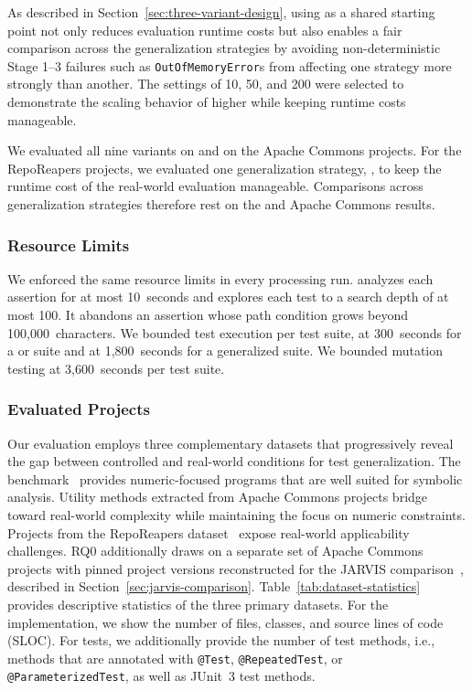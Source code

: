 As described in Section~\ref{sec:three-variant-design},
using \VariantInitial{} as a shared starting point
not only reduces evaluation runtime costs
but also enables a fair comparison
across the generalization strategies
by avoiding non-deterministic Stage 1--3 failures such as \texttt{OutOfMemoryError}s
from affecting one strategy more strongly than another.
The \tries{} settings of 10, 50, and 200 were selected
to demonstrate the scaling behavior of higher \tries{}
while keeping runtime costs manageable.

We evaluated all nine variants on \DatasetEqBench{} and on the Apache Commons projects.
For the RepoReapers projects, we evaluated one generalization strategy, \VariantImprovedC{},
to keep the runtime cost of the real-world evaluation manageable.
Comparisons across generalization strategies therefore
rest on the \DatasetEqBench{} and Apache Commons results.

\subsubsection{Resource Limits}

We enforced the same resource limits in every processing run.
\ToolSPF{} analyzes each assertion for at most 10~seconds
and explores each test to a search depth of at most 100.
It abandons an assertion whose path condition grows beyond 100,000~characters.
We bounded test execution per test suite,
at 300~seconds for a \VariantOriginal{} or \VariantInitial{} suite
and at 1,800~seconds for a generalized suite.
We bounded \ToolPit{} mutation testing at 3,600~seconds per test suite.

\subsubsection{Evaluated Projects}

Our evaluation employs three complementary datasets that progressively
reveal the gap between controlled and real-world conditions for test generalization.
The \DatasetEqBench{} benchmark~\cite{badihi_2021_eqbench}
provides numeric-focused programs
that are well suited for symbolic analysis.
Utility methods extracted from Apache Commons projects
bridge toward real-world complexity while maintaining the focus on numeric constraints.
Projects from the RepoReapers dataset~\cite{munaiah_2017_reporeapers}
expose real-world applicability challenges.
RQ0 additionally draws on a separate set of Apache Commons
projects with pinned project versions reconstructed for the JARVIS comparison~\cite{peleg_2018_jarvis},
described in Section~\ref{sec:jarvis-comparison}.
Table~\ref{tab:dataset-statistics} provides descriptive statistics
of the three primary datasets.
For the implementation, we show the
number of files, classes, and source lines of code (SLOC).
For tests, we additionally provide the number of test methods,
i.e., methods that are annotated with \texttt{@Test}, \texttt{@RepeatedTest}, or \texttt{@ParameterizedTest},
as well as JUnit~3 test methods.

